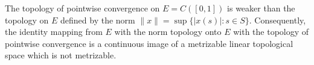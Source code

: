 The topology of pointwise convergence on $E = C([0,1])$ is weaker than the topology on $E$ defined by the norm $\|x\| = \sup \{ |x(s)| : s \in S \}$. Consequently, the identity mapping from $E$ with the norm topology onto $E$ with the topology of pointwise convergence is a continuous image of a metrizable linear topological space which is not metrizable.
